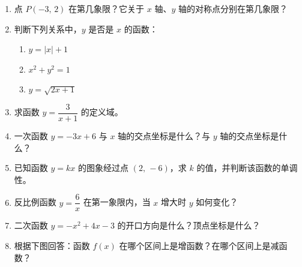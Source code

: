 \documentclass[12pt, a4paper]{ctexart}
\begin{document}
\begin{enumerate}[label=\textbf{\arabic*.}, leftmargin=2.5em]
  \item 点 $P(-3,\,2)$ 在第几象限？它关于 $x$ 轴、$y$ 轴的对称点分别在第几象限？

  \item 判断下列关系中，$y$ 是否是 $x$ 的函数：
        \begin{enumerate}[label=(\alph*)]
          \item $y = |x| + 1$
          \item $x^2 + y^2 = 1$
          \item $y = \sqrt{2x + 1}$
        \end{enumerate}

  \item 求函数 $y = \dfrac{3}{x + 1}$ 的定义域。

  \item 一次函数 $y = -3x + 6$ 与 $x$ 轴的交点坐标是什么？与 $y$ 轴的交点坐标是什么？

  \item 已知函数 $y = kx$ 的图象经过点 $(2,\,-6)$，求 $k$ 的值，并判断该函数的单调性。

  \item 反比例函数 $y = \dfrac{6}{x}$ 在第一象限内，当 $x$ 增大时 $y$ 如何变化？

  \item 二次函数 $y = -x^2 + 4x - 3$ 的开口方向是什么？顶点坐标是什么？

  \item 根据下图回答：函数 $f(x)$ 在哪个区间上是增函数？在哪个区间上是减函数？

\begin{center}
\end{center}
\end{enumerate}
\end{document}
